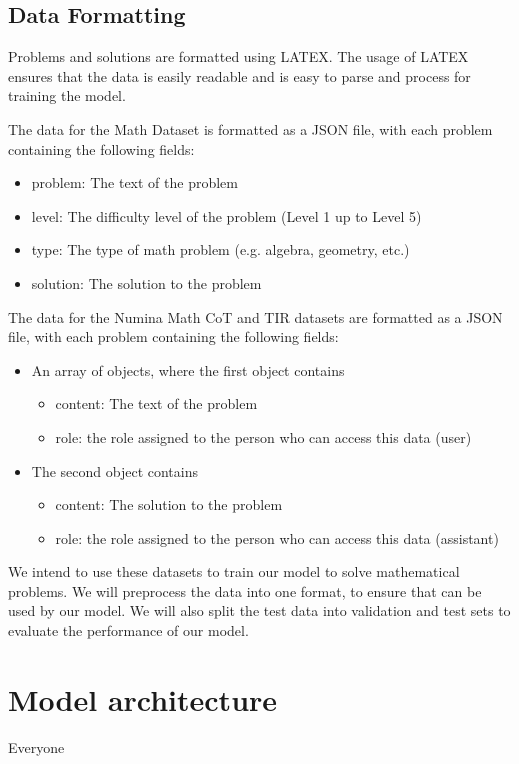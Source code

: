 \documentclass{article}
\begin{document}
\subsection{Data Formatting}

Problems and solutions are formatted using LATEX. The usage of LATEX ensures that the data is easily readable and is easy to parse and process for training the model.

The data for the Math Dataset is formatted as a JSON file, with each problem containing the following fields:
\begin{itemize}
  \item problem: The text of the problem
  \item level: The difficulty level of the problem (Level 1 up to Level 5)
  \item type: The type of math problem (e.g. algebra, geometry, etc.)
  \item solution: The solution to the problem
\end{itemize}

The data for the Numina Math CoT and TIR datasets are formatted as a JSON file, with each problem containing the following fields:
\begin{itemize}
  \item An array of objects, where the first object contains
      \begin{itemize}
        \item content: The text of the problem
        \item role: the role assigned to the person who can access this data (user)
      \end{itemize}
  \item The second object contains
      \begin{itemize}
        \item content: The solution to the problem
        \item role: the role assigned to the person who can access this data (assistant)
      \end{itemize}
\end{itemize}

We intend to use these datasets to train our model to solve mathematical problems. We will preprocess the data into one format, to ensure that can be used by our model. We will also split the test data into validation and test sets to evaluate the performance of our model.

\section{Model architecture}
Everyone
\end{document}
